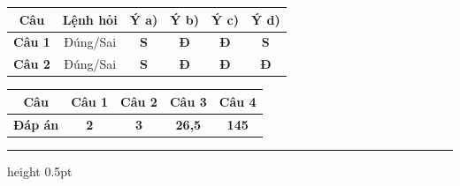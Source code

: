 \documentclass[11pt,a4paper]{article}
\begin{document}
\vspace{3pt}
\begin{center}
\renewcommand{\arraystretch}{1.2}
\begin{tabular}{|c|c|c|c|c|c|}
\hline
\rowcolor{tableGreen}
\textbf{Câu} & \textbf{Lệnh hỏi} & \textbf{Ý a)} & \textbf{Ý b)} & \textbf{Ý c)} & \textbf{Ý d)} \\
\hline
\textbf{Câu 1} & Đúng/Sai & \textbf{\color{mainGreen}S} & \textbf{\color{hfRed}Đ} & \textbf{\color{hfRed}Đ} & \textbf{\color{mainGreen}S} \\
\hline
\textbf{Câu 2} & Đúng/Sai & \textbf{\color{mainGreen}S} & \textbf{\color{hfRed}Đ} & \textbf{\color{hfRed}Đ} & \textbf{\color{hfRed}Đ} \\
\hline
\end{tabular}
\end{center}

\vspace{3pt}
\begin{center}
\renewcommand{\arraystretch}{1.2}
\begin{tabular}{|c|c|c|c|c|}
\hline
\rowcolor{tableGreen}
\textbf{Câu} & \textbf{Câu 1} & \textbf{Câu 2} & \textbf{Câu 3} & \textbf{Câu 4} \\
\hline
\textbf{Đáp án} & \textbf{\color{hfRed}2} & \textbf{\color{hfRed}3} & \textbf{\color{hfRed}26{,}5} & \textbf{\color{hfRed}145} \\
\hline
\end{tabular}
\end{center}
\vspace{6pt}
\hrule height 0.5pt
\vspace{6pt}

\vspace{4pt}
\end{document}
